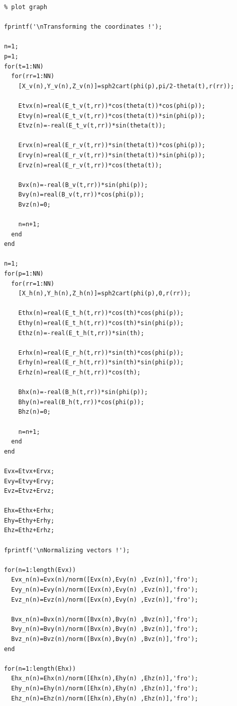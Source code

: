 \documentclass[a4paper,11pt]{thesis}
\begin{document}
\begin{verbatim}
      % plot graph

      fprintf('\nTransforming the coordinates !');

      n=1;
      p=1;
      for(t=1:NN)
        for(rr=1:NN)
          [X_v(n),Y_v(n),Z_v(n)]=sph2cart(phi(p),pi/2-theta(t),r(rr));

          Etvx(n)=real(E_t_v(t,rr))*cos(theta(t))*cos(phi(p));
          Etvy(n)=real(E_t_v(t,rr))*cos(theta(t))*sin(phi(p));
          Etvz(n)=-real(E_t_v(t,rr))*sin(theta(t));

          Ervx(n)=real(E_r_v(t,rr))*sin(theta(t))*cos(phi(p));
          Ervy(n)=real(E_r_v(t,rr))*sin(theta(t))*sin(phi(p));
          Ervz(n)=real(E_r_v(t,rr))*cos(theta(t));

          Bvx(n)=-real(B_v(t,rr))*sin(phi(p));
          Bvy(n)=real(B_v(t,rr))*cos(phi(p));
          Bvz(n)=0;

          n=n+1;
        end
      end

      n=1;
      for(p=1:NN)
        for(rr=1:NN)
          [X_h(n),Y_h(n),Z_h(n)]=sph2cart(phi(p),0,r(rr));

          Ethx(n)=real(E_t_h(t,rr))*cos(th)*cos(phi(p));
          Ethy(n)=real(E_t_h(t,rr))*cos(th)*sin(phi(p));
          Ethz(n)=-real(E_t_h(t,rr))*sin(th);

          Erhx(n)=real(E_r_h(t,rr))*sin(th)*cos(phi(p));
          Erhy(n)=real(E_r_h(t,rr))*sin(th)*sin(phi(p));
          Erhz(n)=real(E_r_h(t,rr))*cos(th);

          Bhx(n)=-real(B_h(t,rr))*sin(phi(p));
          Bhy(n)=real(B_h(t,rr))*cos(phi(p));
          Bhz(n)=0;

          n=n+1;
        end
      end

      Evx=Etvx+Ervx;
      Evy=Etvy+Ervy;
      Evz=Etvz+Ervz;

      Ehx=Ethx+Erhx;
      Ehy=Ethy+Erhy;
      Ehz=Ethz+Erhz;

      fprintf('\nNormalizing vectors !');

      for(n=1:length(Evx))
        Evx_n(n)=Evx(n)/norm([Evx(n),Evy(n) ,Evz(n)],'fro');
        Evy_n(n)=Evy(n)/norm([Evx(n),Evy(n) ,Evz(n)],'fro');
        Evz_n(n)=Evz(n)/norm([Evx(n),Evy(n) ,Evz(n)],'fro');

        Bvx_n(n)=Bvx(n)/norm([Bvx(n),Bvy(n) ,Bvz(n)],'fro');
        Bvy_n(n)=Bvy(n)/norm([Bvx(n),Bvy(n) ,Bvz(n)],'fro');
        Bvz_n(n)=Bvz(n)/norm([Bvx(n),Bvy(n) ,Bvz(n)],'fro');
      end

      for(n=1:length(Ehx))
        Ehx_n(n)=Ehx(n)/norm([Ehx(n),Ehy(n) ,Ehz(n)],'fro');
        Ehy_n(n)=Ehy(n)/norm([Ehx(n),Ehy(n) ,Ehz(n)],'fro');
        Ehz_n(n)=Ehz(n)/norm([Ehx(n),Ehy(n) ,Ehz(n)],'fro');


\end{verbatim}
\end{document}
